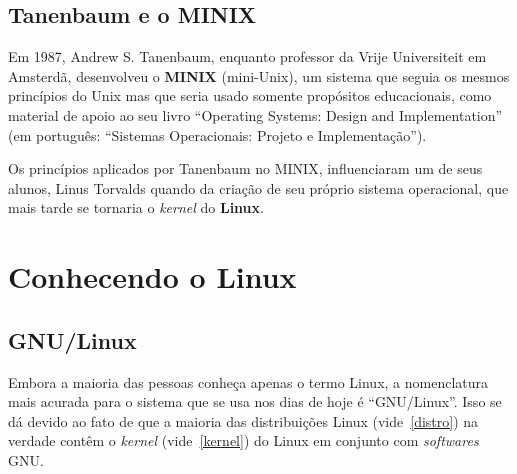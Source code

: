 \documentclass{handout_utfpr}
\begin{document}
\subsection{Tanenbaum e o MINIX}
Em 1987, Andrew S. Tanenbaum, enquanto professor da Vrije Universiteit em Amsterdã, desenvolveu o \textbf{MINIX} (mini-Unix), um sistema que seguia os mesmos princípios do Unix mas que seria usado somente propósitos educacionais, como material de apoio ao seu livro ``Operating Systems: Design and Implementation'' (em português: ``Sistemas Operacionais: Projeto e Implementação'').

Os princípios aplicados por Tanenbaum no MINIX, influenciaram um de seus alunos, Linus Torvalds quando da criação de seu próprio sistema operacional, que mais tarde se tornaria o \textit{kernel} do \textbf{Linux}.






\section{Conhecendo o Linux}

\subsection{GNU/Linux}
Embora a maioria das pessoas conheça apenas o termo Linux, a nomenclatura mais acurada para o sistema que se usa nos dias de hoje é ``GNU/Linux''. Isso se dá devido ao fato de que a maioria das distribuições Linux (vide~\ref{distro}) na verdade contêm o \textit{kernel} (vide~\ref{kernel}) do Linux em conjunto com \textit{softwares} GNU.
\end{document}
